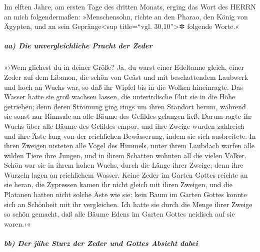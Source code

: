 Im elften Jahre, am ersten Tage des dritten Monats, erging
das Wort des HERRN an mich folgendermaßen: »Menschensohn,
richte an den Pharao, den König von Ägypten, und an sein
Gepränge\textless sup title=``vgl. 30,10''\textgreater✲ folgende Worte.«

\hypertarget{aa-die-unvergleichliche-pracht-der-zeder}{%
\subparagraph{aa) Die unvergleichliche Pracht der
Zeder}\label{aa-die-unvergleichliche-pracht-der-zeder}}

»›Wem glichest du in deiner Größe? Ja, du warst einer
Edeltanne gleich, einer Zeder auf dem Libanon, die schön von Geäst und
mit beschattendem Laubwerk und hoch an Wuchs war, so daß ihr Wipfel bis
in die Wolken hineinragte. Das Wasser hatte sie groß
wachsen lassen, die unterirdische Flut sie in die Höhe getrieben; denn
deren Strömung ging rings um ihren Standort herum, während sie sonst nur
Rinnsale an alle Bäume des Gefildes gelangen ließ. Darum
ragte ihr Wuchs über alle Bäume des Gefildes empor, und ihre Zweige
wurden zahlreich und ihre Äste lang von der reichlichen Bewässerung,
indem sie sich ausbreitete. In ihren Zweigen nisteten alle
Vögel des Himmels, unter ihrem Laubdach warfen alle wilden Tiere ihre
Jungen, und in ihrem Schatten wohnten all die vielen Völker.
Schön war sie in ihrem hohen Wuchs, durch die Länge ihrer
Zweige; denn ihre Wurzeln lagen an reichlichem Wasser.
Keine Zeder im Garten Gottes reichte an sie heran, die
Zypressen kamen ihr nicht gleich mit ihren Zweigen, und die Platanen
hatten nicht solche Äste wie sie: kein Baum im Garten Gottes konnte sich
an Schönheit mit ihr vergleichen. Ich hatte sie durch die
Menge ihrer Zweige so schön gemacht, daß alle Bäume Edens im Garten
Gottes neidisch auf sie waren.‹«

\hypertarget{bb-der-juxe4he-sturz-der-zeder-und-gottes-absicht-dabei}{%
\subparagraph{bb) Der jähe Sturz der Zeder und Gottes Absicht
dabei}\label{bb-der-juxe4he-sturz-der-zeder-und-gottes-absicht-dabei}}

